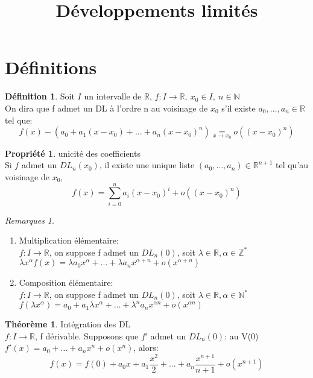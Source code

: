 \documentclass[fleqn]{article}
\title{D\'eveloppements limit\'es}
\date{}
\theoremstyle{definition} \newtheorem*{defi}{D\'efinition}
\theoremstyle{definition} \newtheorem*{theo}{Th\'eor\`eme}
\theoremstyle{definition} \newtheorem*{prop}{Propri\'et\'e}
\theoremstyle{definition} \newtheorem*{coro}{Corollaire}
\theoremstyle{remark} \newtheorem*{rqs}{Remarques}
\begin{document}
\maketitle

\section{D\'efinitions}
\begin{defi}
	Soit $I$ un intervalle de $\mathbb{R}$, $f:I \rightarrow \mathbb{R},\ x_0 \in I,\ n \in \mathbb{N}$ \\
	On dira que f admet un DL \`a l'ordre n au voisinage de $x_0$ s'il existe \mbox{$a_0, \hdots, a_n \in \mathbb{R}$} tel que: \\
	\[f(x) - (a_0 + a_1(x-x_0) + \hdots + a_n(x-x_0)^n) \underset{x \rightarrow x_0}{=} o((x-x_0)^n)\]
\end{defi}

\begin{prop} unicit\'e des coefficients \\
	Si $f$ admet un $DL_n(x_0)$, il existe une unique liste $(a_0, \hdots, a_n) \in \mathbb{R}^{n+1}$ tel qu'au voisinage de $x_0$,
	\[f(x) = \sum_{i=0}^{n} a_i(x-x_0)^i  + o((x-x_0)^n)\]
\end{prop}

\begin{rqs}
	$\ $
	\begin{enumerate}
		\item Multiplication \'el\'ementaire: \\
		$f: I \rightarrow \mathbb{R}$, on suppose f admet un $DL_n(0)$, soit $\lambda \in \mathbb{R}, \alpha \in \mathbb{Z}^{*}$ \\
		$\lambda x^{\alpha} f(x) = \lambda a_0 x^{\alpha} + \hdots + \lambda a_n x^{\alpha+n} + o(x^{\alpha + n})$
		\item Composition \'el\'ementaire: \\
		$f: I \rightarrow \mathbb{R}$, on suppose f admet un $DL_n(0)$, soit $\lambda \in \mathbb{R}, \alpha \in \mathbb{N}^*$ \\
		$f(\lambda x^{\alpha}) = a_0 + a_1 \lambda x^{\alpha} + \hdots + \lambda ^n a_n x^{\alpha n} + o(x^{\alpha n})$
	\end{enumerate}
\end{rqs}

\begin{theo} Int\'egration des DL \\
	$f: I \rightarrow \mathbb{R}$, f d\'erivable. Supposons que $f'$ admet un $DL_n(0)$: au V(0)\\
	$f'(x) = a_0 + \hdots + a_n x^{n} + o(x^n)$, alors:
	\[f(x) = f(0) + a_0 x + a_1 \frac{x^2}{2} + \hdots + a_n \frac{x^{n+1}}{n+1} + o(x^{n+1})\]
\end{theo}
\end{document}

